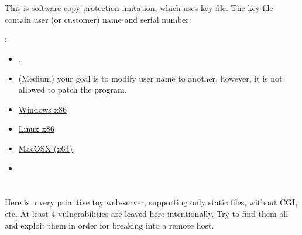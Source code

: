 \section{}

{This is software copy protection imitation, which uses key file}.
{The key file contain user (or customer) name and serial number}.

:

\begin{itemize}
\item
{}.

\item
{}
{(Medium) your goal is to modify user name to another, however, it is not allowed to patch the program}.
\end{itemize}

\begin{itemize}
\item
\href{http://yurichev.com/RE-exercises/3/5/super_mega_protection.exe}{Windows x86}

\item
\href{http://yurichev.com/RE-exercises/3/5/super_mega_protection.tar}{Linux x86}

\item
\href{http://yurichev.com/RE-exercises/3/5/super_mega_protection_MacOSX.tar}{MacOSX (x64)}

\item
\href{http://yurichev.com/RE-exercises/3/5/sample.key}{}
\end{itemize}

\section{}

{Here is a very primitive toy web-server, supporting only static files, without \ac{CGI}, etc}.
{At least 4 vulnerabilities are leaved here intentionally}.
{Try to find them all and exploit them in order for breaking into a remote host}.

